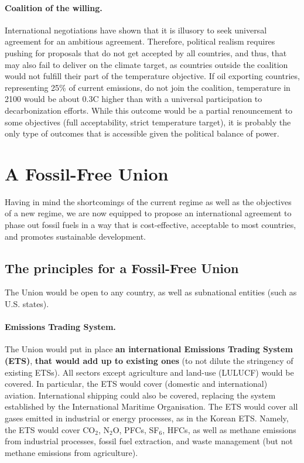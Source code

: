 \documentclass[12pt,english]{article}
\begin{document}
\paragraph{Coalition of the willing.} International negotiations have shown that it is illusory to seek universal agreement for an ambitious agreement. Therefore, political realism requires pushing for proposals that do not get accepted by all countries, and thus, that may also fail to deliver on the climate target, as countries outside the coalition would not fulfill their part of the temperature objective. If oil exporting countries, representing 25\% of current emissions, do not join the coalition, temperature in 2100 would be about 0.3\textdegree{}C higher than with a universal participation to decarbonization efforts. While this outcome would be a partial renouncement to some objectives (full acceptability, strict temperature target), it is probably the only type of outcomes that is accessible given the political balance of power.


\clearpage
\section{A Fossil-Free Union\label{sec:ffu}}

Having in mind the shortcomings of the current regime as well as the objectives of a new regime, we are now equipped to propose an international agreement to phase out fossil fuels in a way that is cost-effective, acceptable to most countries, and promotes sustainable development. 

\subsection{The principles for a Fossil-Free Union\label{subsec:principles}}

The Union would be open to any country, as well as subnational entities (such as U.S. states). 

\paragraph{Emissions Trading System.}
The Union would put in place \textbf{an international Emissions Trading System (ETS)}, \textbf{that would add up to existing ones} (to not dilute the stringency of existing ETSs). All sectors except agriculture and land-use (LULUCF) would be covered. In particular, the ETS would cover (domestic and international) aviation. International shipping could also be covered, replacing the system established by the International Maritime Organisation. The ETS would cover all gases emitted in industrial or energy processes, as in the Korean ETS. Namely, the ETS would cover CO$_\text{2}$, N$_\text{2}$O, PFCs, SF$_\text{6}$, HFCs, as well as methane emissions from industrial processes, fossil fuel extraction, and waste management (but not methane emissions from agriculture). %
\end{document}
